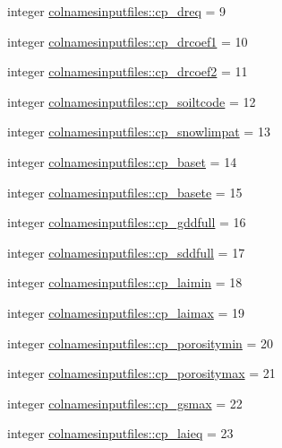 \begin{DoxyCompactItemize}
\item 
integer \hyperlink{namespacecolnamesinputfiles_a725b7724166ff38221e454e7eae16f13}{colnamesinputfiles\+::cp\+\_\+dreq} = 9
\item 
integer \hyperlink{namespacecolnamesinputfiles_a455b13d56e3208b142276baeae8a7809}{colnamesinputfiles\+::cp\+\_\+drcoef1} = 10
\item 
integer \hyperlink{namespacecolnamesinputfiles_ae88715acb6cf39ee3799b87791a64048}{colnamesinputfiles\+::cp\+\_\+drcoef2} = 11
\item 
integer \hyperlink{namespacecolnamesinputfiles_adb82da2e8ebded2ece6d2004655f1ecb}{colnamesinputfiles\+::cp\+\_\+soiltcode} = 12
\item 
integer \hyperlink{namespacecolnamesinputfiles_a6ddb8f287fb7a2cb41191c76325b5753}{colnamesinputfiles\+::cp\+\_\+snowlimpat} = 13
\item 
integer \hyperlink{namespacecolnamesinputfiles_aa6e8702ebc154e97146143ca01742cde}{colnamesinputfiles\+::cp\+\_\+baset} = 14
\item 
integer \hyperlink{namespacecolnamesinputfiles_a582abac43ac49e891a2878897f233d3b}{colnamesinputfiles\+::cp\+\_\+basete} = 15
\item 
integer \hyperlink{namespacecolnamesinputfiles_adec15ce8b05af8e73e70f6b580302216}{colnamesinputfiles\+::cp\+\_\+gddfull} = 16
\item 
integer \hyperlink{namespacecolnamesinputfiles_a8ababcab7676d23c4e8d33b9f8e01054}{colnamesinputfiles\+::cp\+\_\+sddfull} = 17
\item 
integer \hyperlink{namespacecolnamesinputfiles_ac8da6b1293c69ebfd34fb7d4128a1937}{colnamesinputfiles\+::cp\+\_\+laimin} = 18
\item 
integer \hyperlink{namespacecolnamesinputfiles_a6ad16e2a1d9f4a362e883add83a2f494}{colnamesinputfiles\+::cp\+\_\+laimax} = 19
\item 
integer \hyperlink{namespacecolnamesinputfiles_a37ff540870751b79aa26de640778fe4b}{colnamesinputfiles\+::cp\+\_\+porositymin} = 20
\item 
integer \hyperlink{namespacecolnamesinputfiles_a15109f5dcc029ed739bc985f30f555b3}{colnamesinputfiles\+::cp\+\_\+porositymax} = 21
\item 
integer \hyperlink{namespacecolnamesinputfiles_a0d5b92d88004a89290246da71f7158e6}{colnamesinputfiles\+::cp\+\_\+gsmax} = 22
\item 
integer \hyperlink{namespacecolnamesinputfiles_a895f6b4a3919ed0d2952c7d4f3952157}{colnamesinputfiles\+::cp\+\_\+laieq} = 23
\item 

\end{DoxyCompactItemize}
